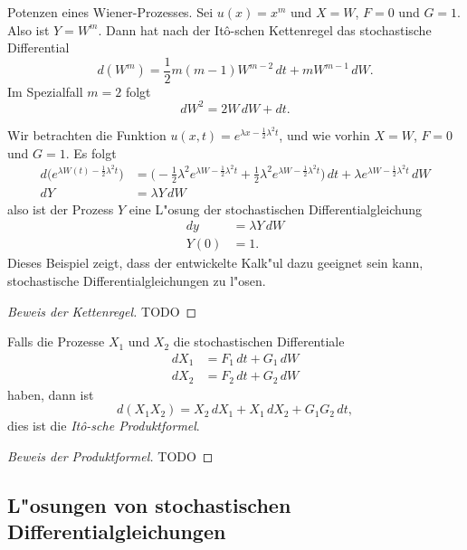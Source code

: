 \begin{beispiel}
Potenzen eines Wiener-Prozesses.
Sei $u(x)=x^m$ und $X=W$, $F=0$ und $G=1$.
Also ist $Y=W^m$.
Dann hat nach der It\^o-schen Kettenregel das stochastische Differential
\[
d(W^m)
=
\frac12m(m-1)W^{m-2}\,dt + mW^{m-1}\,dW.
\]
Im Spezialfall $m=2$ folgt
\[
dW^2 = 2W\,dW + dt.
\]
\end{beispiel}

\begin{beispiel} Wir betrachten die Funktion
$u(x,t)=e^{\lambda x-\frac12\lambda^2 t}$, und wie vorhin $X=W$, $F=0$
und $G=1$.
Es folgt
\begin{align*}
d\biggl(
e^{\lambda W(t)-\frac12\lambda^2 t}
\biggr)
&=
\biggl(
-\frac12\lambda^2 e^{\lambda W-\frac12\lambda^2 t}
+
\frac12\lambda^2 e^{\lambda W-\frac12\lambda^2 t}
\biggr)\,dt
+
\lambda e^{\lambda W -\frac12\lambda^2 t}\,dW
\\
dY&=\lambda Y\,dW
\end{align*}
also ist der Prozess $Y$ eine L"osung der stochastischen Differentialgleichung
\begin{align*}
dy&=\lambda Y\,dW
\\
Y(0)&=1.
\end{align*}
Dieses Beispiel zeigt, dass der entwickelte Kalk"ul dazu geeignet sein kann,
stochastische Differentialgleichungen zu l"osen.
\end{beispiel}

\begin{proof}[Beweis der Kettenregel]
TODO
\end{proof}

\begin{satz}
Falls die Prozesse $X_1$ und $X_2$ die stochastischen Differentiale
\begin{align*}
dX_1
&=
F_1\,dt + G_1\,dW
\\
dX_2
&=
F_2\,dt + G_2\,dW
\end{align*}
haben, dann ist
\[
d(X_1X_2)
=
X_2\,dX_1 + X_1\,dX_2 + G_1G_2\,dt,
\]
dies ist die {\em It\^o-sche Produktformel}.
\end{satz}

\begin{proof}[Beweis der Produktformel]
TODO
\end{proof}


\subsection{L"osungen von stochastischen Differentialgleichungen}





